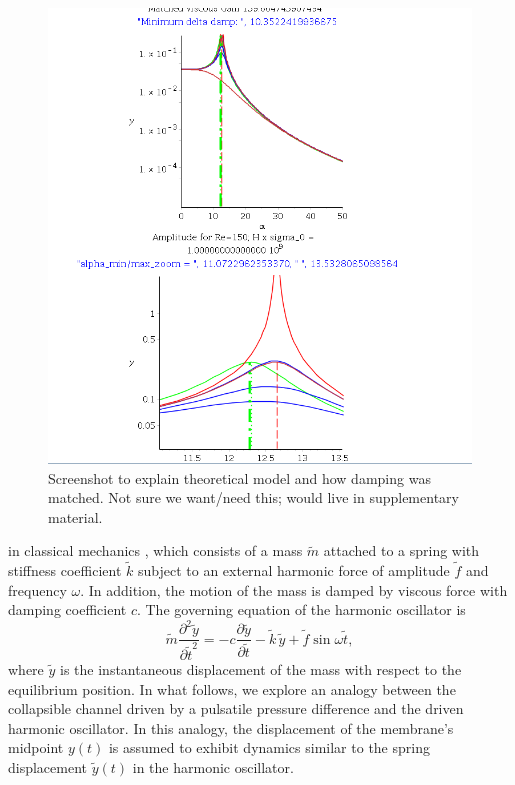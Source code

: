\documentclass[aps,prl,reprint,superscriptaddress,floatfix]{revtex4-1}
\begin{document}
\begin{figure}[h]
\includegraphics[width=0.99\linewidth]{matthias_sketches/resonance_matching_screenshot.png}
\caption{\label{theory_results.png} Screenshot to explain 
theoretical model and how damping was matched. Not sure we want/need
this; would live in supplementary material.}
\end{figure}




\clearpage

\newpage



in classical mechanics \cite{Shabana91}, which consists of a mass $\widetilde{m}$ attached to a spring with stiffness coefficient $\widetilde{k}$ subject to an external harmonic force of amplitude $\widetilde f$ and frequency $\omega$. In addition, the motion of the mass is damped by viscous force with damping coefficient $c$. The governing equation of the harmonic oscillator is
\begin{equation}
\widetilde m\frac{\partial^2 \widetilde y}{\partial {\widetilde t}^2}=-c\frac{\partial \widetilde y}{\partial \widetilde t}-\widetilde k\,\widetilde y+\widetilde f\sin  \omega \widetilde t,
\label{eq:oscillator_eqn}
\end{equation}	
where $\widetilde y$ is the instantaneous displacement of the mass with respect to the equilibrium position. In what follows, we explore an analogy between the collapsible channel driven by a pulsatile pressure difference and the driven harmonic oscillator. In this analogy, the displacement of the membrane's midpoint $y(t)$ is assumed to exhibit dynamics similar to the spring displacement $\widetilde y(t)$ in the harmonic oscillator. 
\end{document}
